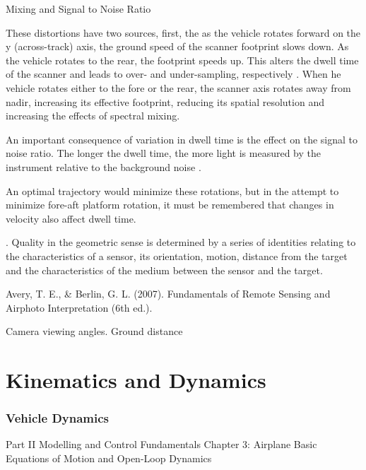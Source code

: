 \documentclass[10pt]{article}
\begin{document}
Mixing and Signal to Noise Ratio

These distortions have two sources, first, the as the vehicle rotates forward on the y (across-track) axis, the ground speed of the scanner footprint slows down. As the vehicle rotates to the rear, the footprint speeds up. This alters the dwell time of the scanner and leads to over- and under-sampling, respectively \cite{Gupta2018}. When he vehicle rotates either to the fore or the rear, the scanner axis rotates away from nadir, increasing its effective footprint, reducing its spatial resolution \cite{Gupta2018} and increasing the effects of spectral mixing. 

An important consequence of variation in dwell time is the effect on the signal to noise ratio. The longer the dwell time, the more light is measured by the instrument relative to the background noise \cite{Rogass2014}.

An optimal trajectory would minimize these rotations, but in the attempt to minimize fore-aft platform rotation, it must be remembered that changes in velocity also affect dwell time.




 \cite{Gupta2018}. 
Quality in the geometric sense is determined by a series of identities relating to the characteristics of a sensor, its orientation, motion, distance from the target and the characteristics of the medium between the sensor and the target.

\cite{Avery2007}
Avery, T. E., \& Berlin, G. L. (2007). Fundamentals of Remote Sensing and Airphoto Interpretation (6th ed.).

Camera viewing angles.
Ground distance


\section{Kinematics and Dynamics}

\subsubsection{Vehicle Dynamics}

\cite{Valavanis2007}

Part II Modelling and Control Fundamentals
Chapter 3: Airplane Basic Equations of Motion and Open-Loop Dynamics
\end{document}

